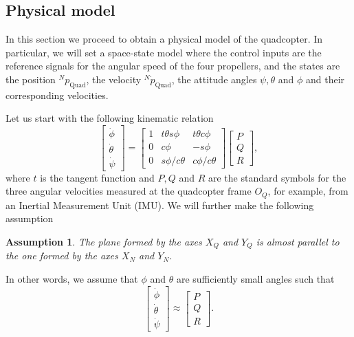 \documentclass[a4paper, onecolumn]{ieeeconf}
\newtheorem{assumption}[theorem]{\textbf{Assumption}}
\begin{document}
\subsection{Physical model}
In this section we proceed to obtain a physical model of the quadcopter. In particular, we will set a space-state model where the control inputs are the reference signals for the angular speed of the four propellers, and the states are the position $^Np_{\text{Quad}}$, the velocity $^N\dot p_{\text{Quad}}$, the attitude angles $\psi, \theta$ and $\phi$ and their corresponding velocities.

Let us start with the following kinematic relation
\begin{equation}
\begin{bmatrix}\dot\phi \\ \dot\theta \\ \dot\psi \end{bmatrix}
	=
	\begin{bmatrix}
	1 & t\theta s\phi & t\theta c\phi \\
	0 & c\phi & -s\phi \\
	0 & s\phi/c\theta & c\phi/c\theta
	\end{bmatrix}
	\begin{bmatrix}
	P \\ Q \\ R
	\end{bmatrix},
\end{equation}
where $t$ is the tangent function and $P, Q$ and $R$ are the standard symbols for the three angular velocities measured at the quadcopter frame $O_Q$, for example, from an Inertial Measurement Unit (IMU). We will further make the following assumption
\begin{assumption}
\label{asu: small}
The plane formed by the axes $X_Q$ and $Y_Q$ is almost parallel to the one formed by the axes $X_N$ and $Y_N$.
\end{assumption}
In other words, we assume that $\phi$ and $\theta$ are sufficiently small angles such that
\begin{equation}
\begin{bmatrix}\dot\phi \\ \dot\theta \\ \dot\psi \end{bmatrix} \approx
	\begin{bmatrix}
	P \\ Q \\ R
	\end{bmatrix}.
\end{equation}
\end{document}
